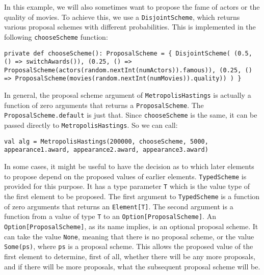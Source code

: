 In this example, we will also sometimes want to propose the fame of actors or the quality of movies. To achieve this, we use a \texttt{Disjoint\-Scheme}, which returns various proposal schemes with different probabilities. This is implemented in the following \texttt{chooseScheme} function:

\begin{flushleft}
\texttt{private def chooseScheme(): ProposalScheme = \{ 
\newline \tab DisjointScheme(
\newline \tab (0.5, () => switchAwards()), 
\newline \tab (0.25, () => 
\newline \tab ProposalScheme(actors(random.nextInt(numActors)).famous)), 
\newline \tab (0.25, () =>
\newline \tab ProposalScheme(movies(random.nextInt(numMovies)).quality))
\newline )
\newline \}
}
\end{flushleft}

In general, the proposal scheme argument of \texttt{MetropolisHastings} is actually a function of zero arguments that returns a \texttt{ProposalScheme}. The \texttt{ProposalScheme.default} is just that. Since \texttt{chooseScheme} is the same, it can be passed directly to \texttt{MetropolisHastings}. So we can call:

\begin{flushleft}
\texttt{val alg =
\newline \tab MetropolisHastings(200000, chooseScheme, 5000, appearance1.award, appearance2.award, appearance3.award) }
\end{flushleft}

In some cases, it might be useful to have the decision as to which later elements to propose depend on the proposed values of earlier elements. \texttt{TypedScheme} is provided for this purpose. It has a type parameter \texttt{T} which is the value type of the first element to be proposed. The first argument to \texttt{TypedScheme} is a function of zero arguments that returns an \texttt{Element[T]}. The second argument is a function from a value of type \texttt{T} to an \texttt{Option[ProposalScheme]}. An \texttt{Option[Proposal\-Scheme]}, as its name implies, is an optional proposal scheme. It can take the value \texttt{None}, meaning that there is no proposal scheme, or the value \texttt{Some(ps)}, where \texttt{ps} is a proposal scheme. This allows the proposed value of the first element to determine, first of all, whether there will be any more proposals, and if there will be more proposals, what the subsequent proposal scheme will be.

